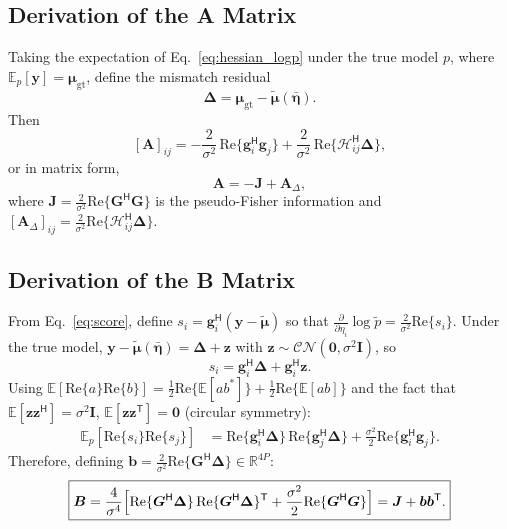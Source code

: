 \documentclass[11pt,a4paper]{article}
\newcommand{\CN}{\mathcal{CN}}
\newcommand{\bmmu}{\bm{\mu}}
\newcommand{\bmtildemu}{\bm{\tilde{\mu}}}
\newcommand{\bmetabar}{\bm{\bar{\eta}}}
\newcommand{\bmy}{\bm{y}}
\newcommand{\bmg}{\bm{g}}
\begin{document}
\subsection{Derivation of the A Matrix}

Taking the expectation of Eq.~\eqref{eq:hessian_logp} under the true
model $p$, where
$\mathbb{E}_p[\bmy] = \bmmu_{\mathrm{gt}}$, define the mismatch
residual
\begin{equation}
  \bm{\Delta} = \bmmu_{\mathrm{gt}} - \bmtildemu(\bmetabar).
\end{equation}
Then
\begin{equation}
  \boxed{
  [\bm{A}]_{ij}
  = -\frac{2}{\sigma^2}\,\mathrm{Re}\!\bigl\{
    \bmg_i^{\mathsf H}\bmg_j\bigr\}
  + \frac{2}{\sigma^2}\,\mathrm{Re}\!\bigl\{
    \bm{\mathcal{H}}_{ij}^{\mathsf H}\bm{\Delta}\bigr\},}
  \label{eq:A_result}
\end{equation}
or in matrix form,
\begin{equation}
  \bm{A} = -\bm{J} + \bm{A}_{\Delta},
\end{equation}
where $\bm{J} = \frac{2}{\sigma^2}\mathrm{Re}\{\bm{G}^{\mathsf H}\bm{G}\}$
is the pseudo-Fisher information and
$[\bm{A}_\Delta]_{ij} =
\frac{2}{\sigma^2}\mathrm{Re}\{\bm{\mathcal{H}}_{ij}^{\mathsf H}\bm{\Delta}\}$.

\subsection{Derivation of the B Matrix}

From Eq.~\eqref{eq:score}, define
$s_i = \bmg_i^{\mathsf H}(\bmy - \bmtildemu)$ so that
$\frac{\partial}{\partial\eta_i}\log\tilde{p}
= \frac{2}{\sigma^2}\mathrm{Re}\{s_i\}$. Under the true model,
$\bmy - \bmtildemu(\bmetabar) = \bm{\Delta} + \bm{z}$ with
$\bm{z}\sim\CN(\bm{0},\sigma^2\bm{I})$, so
\begin{equation}
  s_i = \bmg_i^{\mathsf H}\bm{\Delta}
  + \bmg_i^{\mathsf H}\bm{z}.
\end{equation}
Using $\mathbb{E}[\mathrm{Re}\{a\}\mathrm{Re}\{b\}]
= \tfrac{1}{2}\mathrm{Re}\{\mathbb{E}[ab^{*}]\}
+ \tfrac{1}{2}\mathrm{Re}\{\mathbb{E}[ab]\}$
and the fact that $\mathbb{E}[\bm{z}\bm{z}^{\mathsf H}]=\sigma^2\bm{I}$,
$\mathbb{E}[\bm{z}\bm{z}^{\mathsf T}]=\bm{0}$ (circular symmetry):
\begin{align}
  \mathbb{E}_p[\mathrm{Re}\{s_i\}\mathrm{Re}\{s_j\}]
  &= \mathrm{Re}\{\bmg_i^{\mathsf H}\bm{\Delta}\}\,
     \mathrm{Re}\{\bmg_j^{\mathsf H}\bm{\Delta}\}
  + \frac{\sigma^2}{2}\mathrm{Re}\{
    \bmg_i^{\mathsf H}\bmg_j\}.
\end{align}
Therefore, defining
$\bm{b} = \frac{2}{\sigma^2}\mathrm{Re}\{\bm{G}^{\mathsf H}\bm{\Delta}\}
\in\mathbb{R}^{4P}$:
\begin{equation}
  \boxed{
  \bm{B}
  = \frac{4}{\sigma^4}\Bigl[
    \mathrm{Re}\{\bm{G}^{\mathsf H}\bm{\Delta}\}\,
    \mathrm{Re}\{\bm{G}^{\mathsf H}\bm{\Delta}\}^{\mathsf T}
    + \frac{\sigma^2}{2}\mathrm{Re}\{\bm{G}^{\mathsf H}\bm{G}\}
    \Bigr]
  = \bm{J} + \bm{b}\bm{b}^{\mathsf T}.}
  \label{eq:B_result}
\end{equation}
\end{document}
